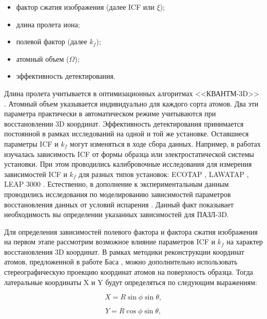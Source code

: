 \begin{itemize}[beginpenalty=10000] %
	\item фактор сжатия изображения (далее ICF или $\xi$);
	\item длина пролета иона;
	\item полевой фактор (далее $k_f$);
	\item атомный объем ($\Omega$);
	\item эффективность детектирования.
\end{itemize}

Длина пролета учитывается в оптимизационных алгоритмах <<КВАНТМ-3D>> \cite{Shutov18,Shutov19}. Атомный объем указывается индивидуально для каждого сорта атомов. Два эти параметра практически в автоматическом режиме учитываются при восстановлении 3D координат. Эффективность детектирования принимается постоянной в рамках исследований на одной и той же установке. Оставшиеся параметры ICF и $k_f$ могут изменяться в ходе сбора данных. Например, в работах \cite{Geiser09,Gipson08} изучалась зависимость ICF от формы образца или электростатической системы установки. При этом проводились калибровочные исследования для измерения зависимостей ICF и $k_f$ для разных типов установок: ECOTAP \cite{Geiser09}, LAWATAP \cite{Renaud03}, LEAP 3000 \cite{Renaud06}. Естественно, в дополнение к экспериментальным данным проводились исследования по моделированию зависимостей параметров восстановления данных от условий испарения \cite{Vurpillot11,Miller14,Hatzoglou19}. Данный факт показывает необходимость вы определении указанных зависимостей для ПАЗЛ-3D.

Для определения зависимостей полевого фактора и фактора сжатия изображения на первом этапе рассмотрим возможное влияние параметров ICF и $k_f$ на  характер восстановления 3D координат. В рамках методики реконструкции координат атомов, предложенной в работе Баса \cite{Bas95}, можно дополнительно использовать стереографическую проекцию координат атомов на поверхность образца. Тогда латеральные координаты X и Y будут определяться по следующим выражениям:

\begin{equation}
	\label{eq:equation3_1}
	X = R \sin{\phi}\sin{\theta},	
\end{equation}

\begin{equation}
	\label{eq:equation3_2}
	Y = R \cos{\phi}\sin{\theta},	
\end{equation}

